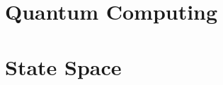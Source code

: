 \documentclass[11pt,oneside]{book}
\begin{document}
\part{Quantum Computing}






\part{State Space}




\appendix



\end{document}

